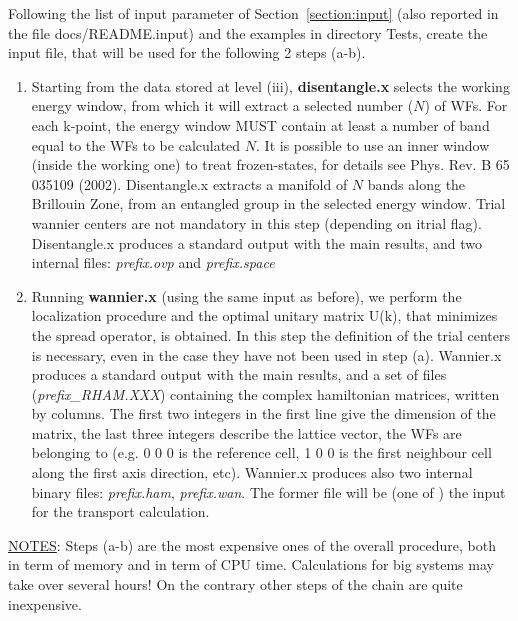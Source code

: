 Following the list of input parameter of
Section~\ref{section:input} (also reported in the file
docs/README.input) and the examples in directory Tests, create the
input file, that will be used for the following 2 steps (a-b).
\renewcommand{\theenumi}{\alph{enumi}}
\renewcommand{\labelenumi}{\theenumi)}
\begin{enumerate}
\item Starting from the data stored at level (iii), {\bf
      disentangle.x}
      selects the working energy window, from which
      it will extract a selected number ($N$) of  WFs.
      For each k-point, the energy window  MUST
      contain at least a number of band equal to the WFs to be calculated $N$.
      It is possible to use an inner window (inside the working one) to
      treat frozen-states, for details see Phys. Rev. B 65 035109 (2002).
      Disentangle.x extracts a manifold of $N$ bands along
      the Brillouin Zone, from an entangled group in the selected energy window.
      Trial wannier centers are not mandatory in this step (depending
      on itrial flag).
      Disentangle.x produces a standard output with the main results,
      and two internal files: {\em prefix.ovp} and {\em
      prefix.space}
\item Running {\bf wannier.x} (using the same input as before), we
      perform the localization
      procedure and the optimal unitary matrix U(k), that minimizes the
      spread operator, is obtained.
      In this step the definition of the trial centers is necessary, even
      in the case they have not been used in step (a).
      Wannier.x produces a standard output with the main results, and
      a set of files ({\em prefix\_RHAM.XXX}) containing the
      complex hamiltonian matrices, written by columns. The first two integers
      in the first line give the dimension of the matrix, the last
      three integers describe the lattice vector, the WFs are belonging
      to (e.g. 0 0 0 is the reference cell, 1 0 0 is the first neighbour
      cell along the first axis direction, etc).
      Wannier.x produces also two internal binary files: {\em prefix.ham}, {\em prefix.wan}.
      The former file will be (one of ) the  input for the transport calculation.
\end{enumerate}

\noindent \underline{NOTES}: Steps (a-b) are the most expensive
ones of the overall procedure, both in term of memory and in term
of CPU time. Calculations for big systems may take over several
hours! On the contrary other steps of the chain are quite
inexpensive.\\

